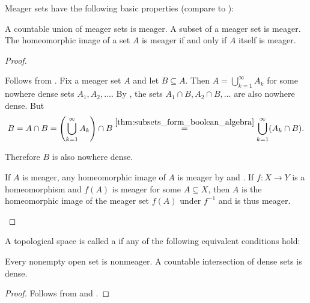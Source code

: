 \begin{proposition}\label{thm:meager_set_properties}\cite[43]{Rudin1991}
  Meager sets have the following basic properties (compare to ):
  \begin{propenum}
     A countable union of meager sets is meager.
     A subset of a meager set is meager.
     The homeomorphic image of a set \( A \) is meager if and only if \( A \) itself is meager.
  \end{propenum}
\end{proposition}
\begin{proof}
  \begin{description}
     Follows from .
     Fix a meager set \( A \) and let \( B \subseteq A \). Then \( A = \bigcup_{k=1}^\infty A_k \) for some nowhere dense sets \( A_1, A_2, \ldots \). By , the sets \( A_1 \cap B, A_2 \cap B, \ldots \) are also nowhere dense. But
    \begin{equation*}
      B
      =
      A \cap B
      =
      \left(\bigcup_{k=1}^\infty A_k \right) \cap B
      \overset {\ref{thm:subsets_form_boolean_algebra}} =
      \bigcup_{k=1}^\infty (A_k \cap B).
    \end{equation*}

    Therefore \( B \) is also nowhere dense.

    \mbox{}
    \begin{description}
      \ImpliedBy If \( A \) is meager, any homeomorphic image of \( A \) is meager by  and .
      \Implies If \( f: X \to Y \) is a homeomorphism and \( f(A) \) is meager for some \( A \subseteq X \), then \( A \) is the homeomorphic image of the meager set \( f(A) \) under \( f^{-1} \) and is thus meager.
    \end{description}
  \end{description}
\end{proof}

\begin{definition}\label{def:baire_space}
  A topological space is called a  if any of the following equivalent conditions hold:
  \begin{defenum}
     Every nonempty open set is nonmeager.
     A countable intersection of dense sets is dense.
  \end{defenum}
\end{definition}
\begin{proof}
   Follows from  and .
\end{proof}

